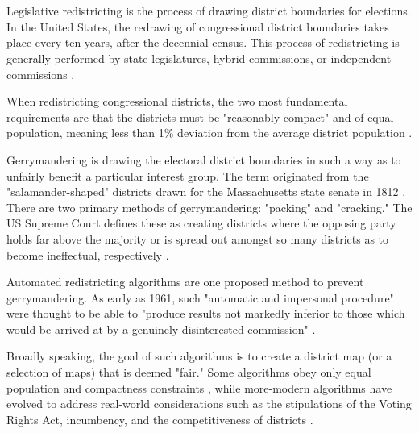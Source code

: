 \makeatletter
\section{\@title}
\makeatother

Legislative redistricting is the process of drawing district boundaries for elections. In the United States, the redrawing of congressional district boundaries takes place every ten years, after the decennial census. This process of redistricting is generally performed by state legislatures, hybrid commissions, or independent commissions \parencite{princetongerrymanderingproject}. 

When redistricting congressional districts, the two most fundamental requirements are that the districts must be "reasonably compact" and of equal population, meaning less than 1\% deviation from the average district population \parencite{1964}. 

Gerrymandering is drawing the electoral district boundaries in such a way as to unfairly benefit a particular interest group. The term originated from the "salamander-shaped" districts drawn for the Massachusetts state senate in 1812 \parencite{hunter2011}. There are two primary methods of gerrymandering: "packing" and "cracking." The US Supreme Court defines these as creating districts where the opposing party holds far above the majority or is spread out amongst so many districts as to become ineffectual, respectively \parencite{1986}.

Automated redistricting algorithms are one proposed method to prevent gerrymandering. As early as 1961, such "automatic and impersonal procedure" were thought to be able to "produce results not markedly inferior to those which would be arrived at by a genuinely disinterested commission" \parencite[110]{vickrey1961}.

Broadly speaking, the goal of such algorithms is to create a district map (or a selection of maps) that is deemed "fair." Some algorithms obey only equal population and compactness constraints \parencite[e.g.][]{hu1995, altman2009, chen2013}, while more-modern algorithms have evolved to address real-world considerations such as the stipulations of the Voting Rights Act, incumbency, and the competitiveness of districts \parencite[e.g][]{lara-caballero2019, fifield2020, mccartan2020}. 

